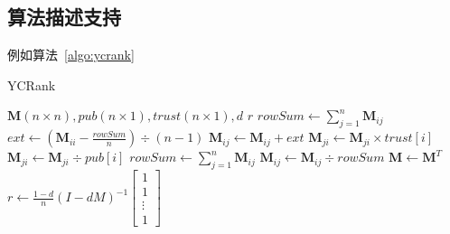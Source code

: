 \subsection{算法描述支持}
例如算法~\ref{algo:ycrank}
\begin{algorithm}[hbt]
    \caption{YCRank}
    \begin{algorithmic}
        \REQUIRE $\mathbf{M}(n \times n),pub(n\times 1),trust(n\times 1),d$
        \ENSURE $r$
                \STATE $rowSum \gets \sum_{j=1}^{n}\mathbf{M}_{ij}$
                    \STATE $ext\gets (\mathbf{M}_{ii}-\frac{rowSum}{n})\div(n-1)$ 
                        \STATE $\mathbf{M}_{ij} \gets \mathbf{M}_{ij} + ext$
                    \ENDFOR
                \ENDIF
            \ENDFOR
                \STATE $\mathbf{M}_{ji} \gets \mathbf{M}_{ji} \times trust[i]$
            \ENDFOR
                \STATE $\mathbf{M}_{ji} \gets \mathbf{M}_{ji} \div pub[i]$
            \ENDFOR
                \STATE $rowSum \gets \sum_{j=1}^{n}\mathbf{M}_{ij}$
                    \STATE $\mathbf{M}_{ij} \gets \mathbf{M}_{ij}\div rowSum$
                \ENDFOR
            \ENDFOR
            \STATE $\mathbf{M} \gets \mathbf{M}^T$
            \STATE $r \gets \frac{1-d}{n}(I-dM)^{-1}\begin{bmatrix}1\\1\\\vdots\\1\end{bmatrix}$
    \end{algorithmic}
    \label{algo:ycrank}
\end{algorithm}